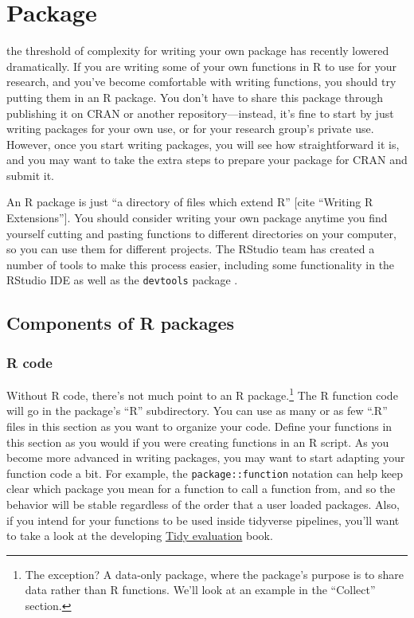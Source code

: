 \documentclass[]{tufte-book}
\begin{document}
\hypertarget{package}{%
\chapter{Package}\label{package}}

 the threshold of complexity
for writing your own package has recently lowered dramatically. If you are writing
some of your own functions in R to use for your research, and you've become comfortable
with writing functions, you should try putting them in an R package. You don't have
to share this package through publishing it on CRAN or another repository---instead, it's
fine to start by just writing packages for your own use, or for your research group's
private use. However, once you start writing packages, you will see how straightforward
it is, and you may want to take the extra steps to prepare your package for CRAN and
submit it.

An R package is just ``a directory of files which extend R'' {[}cite ``Writing R Extensions''{]}.
You should consider writing your own package anytime you find yourself cutting and pasting
functions to different directories on your computer, so you can use them for different
projects. The RStudio team has created a number of tools to make this process easier, including
some functionality in the RStudio IDE as well as the \texttt{devtools} package \citep{R-devtools}.

\hypertarget{components-of-r-packages}{%
\section{Components of R packages}\label{components-of-r-packages}}

\hypertarget{r-code}{%
\subsection{R code}\label{r-code}}

Without R code, there's not much point to an R package.\footnote{The exception? A data-only package,
  where the package's purpose is to share data rather than R functions. We'll look at an
  example in the ``Collect'' section.} The R function code will go in the package's ``R''
subdirectory. You can use as many or as few ``.R'' files in this section as you want to
organize your code.
Define your functions in this section as you would if you were creating functions in
an R script. As you become more advanced in writing packages, you may want to start
adapting your function code a bit. For example, the \texttt{package::function} notation can
help keep clear which package you mean for a function to call a function from, and so
the behavior will be stable regardless of the order that a user loaded packages.
Also, if you intend for your functions to be used inside tidyverse pipelines, you'll
want to take a look at the developing \href{https://tidyeval.tidyverse.org/}{Tidy evaluation} book.
\end{document}
